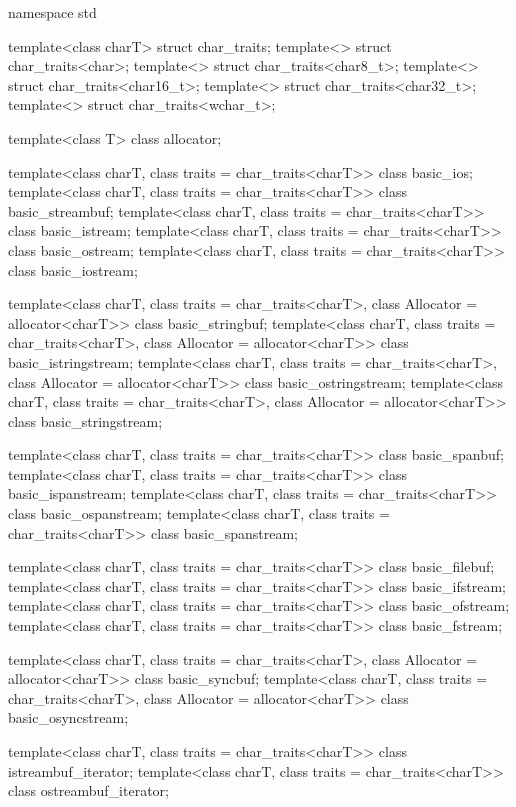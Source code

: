 \begin{codeblock}
namespace std {
  template<class charT> struct char_traits;
  template<> struct char_traits<char>;
  template<> struct char_traits<char8_t>;
  template<> struct char_traits<char16_t>;
  template<> struct char_traits<char32_t>;
  template<> struct char_traits<wchar_t>;

  template<class T> class allocator;

  template<class charT, class traits = char_traits<charT>>
    class basic_ios;
  template<class charT, class traits = char_traits<charT>>
    class basic_streambuf;
  template<class charT, class traits = char_traits<charT>>
    class basic_istream;
  template<class charT, class traits = char_traits<charT>>
    class basic_ostream;
  template<class charT, class traits = char_traits<charT>>
    class basic_iostream;

  template<class charT, class traits = char_traits<charT>, class Allocator = allocator<charT>>
    class basic_stringbuf;
  template<class charT, class traits = char_traits<charT>, class Allocator = allocator<charT>>
    class basic_istringstream;
  template<class charT, class traits = char_traits<charT>, class Allocator = allocator<charT>>
    class basic_ostringstream;
  template<class charT, class traits = char_traits<charT>, class Allocator = allocator<charT>>
    class basic_stringstream;

  template<class charT, class traits = char_traits<charT>>
    class basic_spanbuf;
  template<class charT, class traits = char_traits<charT>>
    class basic_ispanstream;
  template<class charT, class traits = char_traits<charT>>
    class basic_ospanstream;
  template<class charT, class traits = char_traits<charT>>
    class basic_spanstream;

  template<class charT, class traits = char_traits<charT>>
    class basic_filebuf;
  template<class charT, class traits = char_traits<charT>>
    class basic_ifstream;
  template<class charT, class traits = char_traits<charT>>
    class basic_ofstream;
  template<class charT, class traits = char_traits<charT>>
    class basic_fstream;

  template<class charT, class traits = char_traits<charT>, class Allocator = allocator<charT>>
    class basic_syncbuf;
  template<class charT, class traits = char_traits<charT>, class Allocator = allocator<charT>>
    class basic_osyncstream;

  template<class charT, class traits = char_traits<charT>>
    class istreambuf_iterator;
  template<class charT, class traits = char_traits<charT>>
    class ostreambuf_iterator;

}
\end{codeblock}
